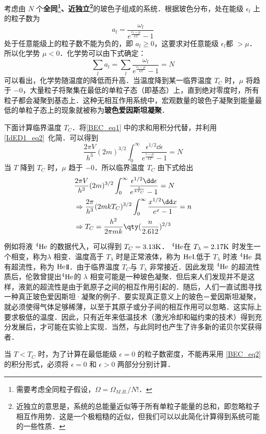 

考虑由 $N$ 个\textbf{全同\footnote{需要考虑全同粒子假设，$\Omega=\Omega_{M.B.}/N!$．}、近独立\footnote{近独立的意思是，系统的总能量近似等于所有单粒子能量的总和，即忽略粒子相互作用势．这是一个极粗糙的近似，但我们可以以此简化计算得到系统可能的一些性质．}}的玻色子组成的系统．根据玻色分布，处在能级 $\epsilon_l$ 上的粒子数为
\begin{equation}
a_l=\frac{\omega_l}{e^{\frac{\epsilon_l-\mu}{kT}}-1}
\end{equation}
处于任意能级上的粒子数不能为负的，即 $a_l\ge 0$，这要求对任意能级 $\epsilon_l$都 $>\mu$．所以化学势 $\mu<0$．化学势可以由下式确定：
\begin{equation}\label{BEC_eq1}
\sum_la_l=\sum_l \frac{\omega_l}{e^{\frac{\epsilon_l-\mu}{kT}}-1} =N
\end{equation}
可以看出，化学势随温度的降低而升高．当温度降到某一临界温度 $T_C$ 时，$\mu$ 将趋于 $-0$，大量粒子将聚集在最低的单粒子态（即基态）上，直到绝对零度时，所有粒子都会凝聚到基态上．这种无相互作用系统中，宏观数量的玻色子凝聚到能量最低的单粒子态上的现象就被称为\textbf{玻色爱因斯坦凝聚}．

下面计算临界温度 $T_C$．将\autoref{BEC_eq1} 中的求和用积分代替，并利用\autoref{IdED1_eq2}~化简．可以得到
\begin{equation}
\frac{2\pi V}{h^3}(2m)^{3/2}\int_0^\infty \frac{\epsilon^{1/2}\dd \epsilon}{e^{\frac{\epsilon-\mu}{kT}}-1}=N
\end{equation}
当 $T$ 降到 $T_C$ 时，$\mu$ 趋于 $-0$．所以临界温度 $T_C$ 由下式给出
\begin{equation}\label{BEC_eq2}
\begin{aligned}
&\frac{2\pi V}{h^3}(2m)^{3/2}\int_0^\infty \frac{\epsilon^{1/2}\dd \epsilon}{e^{\frac{\epsilon}{kT_C}}-1}=N\\
&\Rightarrow \frac{2\pi}{h^3}(2mkT_C)^{3/2}\int_0^\infty \frac{x^{1/2}\dd x}{e^x-1}=n\\
&\Rightarrow T_C=\frac{h^2}{2\pi mk}\qty(\frac{n}{2.612})^{2/3}
\end{aligned}
\end{equation}

例如将液 $^4\rm{He}$ 的数据代入，可以得到 $T_C=3.13\rm{K}$．  $^4\rm{He}$在 $T_\lambda=2.17\rm{K}$ 时发生一个相变，称为$\lambda$ 相变．温度高于 $T_\lambda$ 时是正常液体，称为 $\rm{He}$Ⅰ.低于 $T_\lambda$ 时液 $^4\rm{He}$ 具有超流性，称为 $\rm{He}$Ⅱ．由于临界温度 $T_C$与 $T_\lambda$ 非常接近．因此发现 $^4\rm{He}$ 的超流性质后，伦敦曾提出$^4\rm{He}$的 $\lambda$ 相变可能是一种玻色凝聚．但后来人们发现并不是这样，液氦的超流性是由于氦原子之间的相互作用引起的．随后，人们一直试图寻找一种真正玻色爱因斯坦·凝聚的例子．要实现真正意义上的玻色－爱因斯坦凝聚，就必须使得气体足够稀薄，以至于其原子或分子间的相互作用可以忽略．这实际上要求极低的温度．因此，只有近年来低温技术（激光冷却和磁约束的技术）得到充分发展后，才可能在实验上实现．当然，与此同时也产生了许多新的诺贝尔奖获得者．

当 $T<T_C$ 时，为了计算在最低能级 $\epsilon=0$ 的粒子数密度，不能再采用 \autoref{BEC_eq2} 的积分形式，必须将 $\epsilon=0$ 和 $\epsilon>0$ 两部分分别计算．
